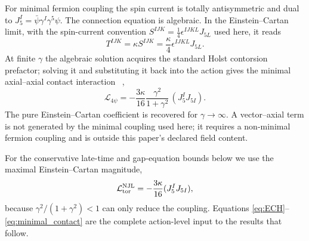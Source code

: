 \documentclass[aps,prd,twocolumn,superscriptaddress,showpacs,preprintnumbers,nofootinbib,longbibliography,floatfix]{revtex4-2}
\begin{document}
For minimal fermion coupling the spin current is totally antisymmetric and
dual to $J_5^I=\bar\psi\gamma^I\gamma^5\psi$.  The connection equation is
algebraic.  In the Einstein--Cartan limit, with the spin-current convention
$S^{IJK}=\tfrac14\epsilon^{IJKL}J_{5L}$ used here, it reads
\begin{equation}\label{eq:torsion}
T^{IJK}=\kappa S^{IJK}=\frac{\kappa}{4}\epsilon^{IJKL}J_{5L}.
\end{equation}
At finite $\gamma$ the algebraic solution acquires the standard Holst
contorsion prefactor; solving it and substituting it back into the action gives
the minimal axial--axial contact interaction
~\cite{Freidel2005,Mercuri2009},
\begin{equation}\label{eq:4fermi}
\mathcal L_{4\psi}=-\frac{3\kappa}{16}
\frac{\gamma^2}{1+\gamma^2}\,(J_5^I J_{5I}).
\end{equation}
The pure Einstein--Cartan coefficient is recovered for
$\gamma\rightarrow\infty$.  A vector--axial term is not generated by the
minimal coupling used here; it requires a non-minimal fermion coupling and is
outside this paper's declared field content.

For the conservative late-time and gap-equation bounds below we use the
maximal Einstein--Cartan magnitude,
\begin{equation}\label{eq:minimal_contact}
\mathcal L^{\rm NJL}_{\rm tor}=-\frac{3\kappa}{16}(J_5^I J_{5I}),
\end{equation}
because $\gamma^2/(1+\gamma^2)<1$ can only reduce the coupling.  Equations
\eqref{eq:ECH}--\eqref{eq:minimal_contact} are the complete action-level input to
the results that follow.
\end{document}
